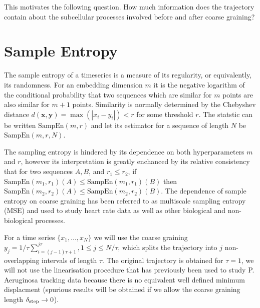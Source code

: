 \documentclass{article}
\newcommand{\vct}[1]{\bm{#1}} %
\begin{document}
This motivates the following question. How much information does the trajectory
contain about the subcellular processes involved before and after coarse graining?


\section{Sample Entropy}

The sample entropy of a timeseries\cite{delgado2019approximate} is a measure
of its regularity, or equivalently, its randomness. For an embedding dimension $m$ it is 
the negative logarithm of the conditional probability that two sequences
which are similar for $m$ points are also similar for $m+1$ 
points\cite{richman2000physiological}. Similarity is normally determined by
the Chebyshev distance $d(\vct{x},\vct{y}) = \max(|x_i - y_i|) < r$ 
for some threshold $r$. The statstic can be written
$\text{SampEn}(m, r)$ and let its estimator for a sequence of length $N$
be $\text{SampEn}(m, r, N)$.

The sampling entropy is hindered by its dependence on both hyperparameters
$m$ and $r$, however its interpretation is greatly enchanced by 
its relative consistency that for two sequences $A, B$, and $r_1 \leq r_2$,
if 
$\text{SampEn}(m_1, r_1)(A) \leq \text{SampEn}(m_1, r_1)(B)$  
then
$\text{SampEn}(m_2, r_2)(A) \leq \text{SampEn}(m_2, r_2)(B)$.
The dependence of sample entropy on coarse graining 
has been referred to as multiscale sampling entropy (MSE)
and used to study heart rate data\cite{costa2002multiscale}
as well as other biological and non-biological processes. 

For a time series $\{x_1,\ldots,x_N\}$
we will use the coarse graining 
${ y_j = 1/\tau \sum_{i=(j-1)\tau+1}^{j\tau}, 1 \leq j \leq N/\tau }$,
which splits the trajectory into $j$ non-overlapping intervals 
of length $\tau$. 
The original trajectory is obtained for $\tau = 1$, 
we will not use the linearisation procedure that has previously been used to study
P. Aeruginosa tracking data because there is no equivalent well defined minimum displacment
(spurious results will be obtained if we allow the 
coarse graining length $\delta_{\text{step}} \rightarrow 0$).
\end{document}
